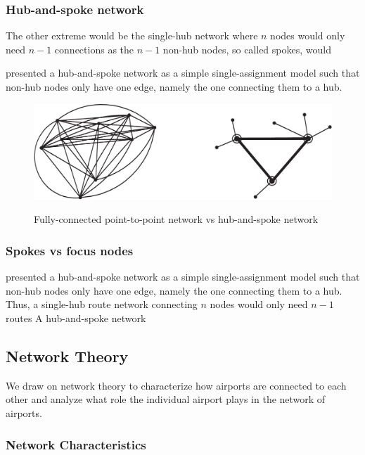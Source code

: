 \subsubsection{Hub-and-spoke network}
The other extreme would be the single-hub network where $n$ nodes would only need $n-1$ connections as the $n-1$ non-hub nodes, so called spokes, would
 \par
\citet{o1987quadratic} presented a hub-and-spoke network as a simple single-assignment model such that non-hub nodes only have one edge, namely the one connecting them to a hub.


\begin{figure}[H]
  \centering
  \caption{Fully-connected point-to-point network vs hub-and-spoke network}
    \includegraphics[width=1. \textwidth]{03_figures/Bryan_1999_networks}
  \label{fig:different_networks}
\end{figure}

\subsubsection{Spokes vs focus nodes}
\citet{o1987quadratic} presented a hub-and-spoke network as a simple single-assignment model such that non-hub nodes only have one edge, namely the one connecting them to a hub. Thus, a single-hub route network connecting $n$ nodes would only need $n-1$ routes
A hub-and-spoke network

\subsection{Network Theory}
\label{subsec:Network Theory}
We draw on network theory to characterize how airports are connected to each other and analyze what role the individual airport plays in the network of airports. %

\subsubsection{Network Characteristics}
